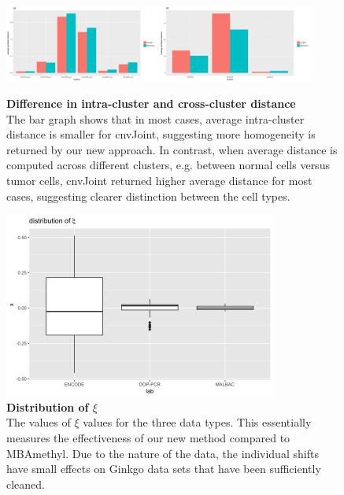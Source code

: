 \documentclass[11pt]{article}
\begin{document}
\begin{figure}[h]
\centering
\includegraphics[width=0.45\textwidth]{intraclusters_bar.pdf}
\includegraphics[width=0.45\textwidth]{acrossclusters_bar.pdf}\\
\caption{\label{diff_bar}
\textbf{Difference in intra-cluster and cross-cluster distance}\\
The bar graph shows that in most cases, average intra-cluster distance is smaller for cnvJoint, suggesting more homogeneity is returned by our new approach. In contrast, when average distance is computed across different clusters, e.g. between normal cells versus tumor cells, cnvJoint returned higher average distance for most cases, suggesting clearer distinction between the cell types. 
}
\end{figure}

\begin{figure}[h]
\centering
\includegraphics[width=0.8\textwidth]{dist_xi.png}
\caption{\label{dist_xi}
\textbf{Distribution of $\xi$}\\The values of $\xi$ values for the three data types. This essentially measures the effectiveness of our new method compared to MBAmethyl. Due to the nature of the data, the individual shifts have small effects on Ginkgo data sets that have been sufficiently cleaned. 
}
\end{figure}





\end{document}
